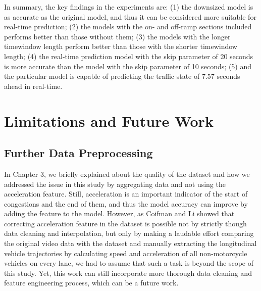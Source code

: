 \documentclass[11pt]{uonthesis}
\begin{document}
In summary, the key findings in the experiments are: (1) the downsized model is as accurate as the original model, and thus it can be considered more suitable for real-time prediction; (2) the models with the on- and off-ramp sections included performs better than those without them; (3) the models with the longer timewindow length perform better than those with the shorter timewindow length; (4) the real-time prediction model with the skip parameter of 20 seconds is more accurate than the model with the skip parameter of 10 seconds; (5) and the particular model is capable of predicting the traffic state of 7.57 seconds ahead in real-time.

\chapter{Limitations and Future Work}

\section{Further Data Preprocessing}

In Chapter 3, we briefly explained about the quality of the dataset and how we addressed the issue in this study by aggregating data and not using the acceleration feature. Still, acceleration is an important indicator of the start of congestions and the end of them, and thus the model accuracy can improve by adding the feature to the model. However, as Coifman and Li \cite{COIFMAN2017362} showed that correcting acceleration feature in the dataset is possible not by strictly though data cleaning and interpolation, but only by making a laudable effort comparing the original video data with the dataset and manually extracting the longitudinal vehicle trajectories by calculating speed and acceleration of all non-motorcycle vehicles on every lane, we had to assume that such a task is beyond the scope of this study. Yet, this work can still incorporate more thorough data cleaning and feature engineering process, which can be a future work.
\end{document}
